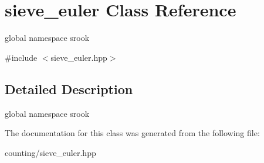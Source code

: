 \hypertarget{classsieve__euler}{}\section{sieve\+\_\+euler Class Reference}
\label{classsieve__euler}


global namespace srook  




{\ttfamily \#include $<$sieve\+\_\+euler.\+hpp$>$}



\subsection{Detailed Description}
global namespace srook 

The documentation for this class was generated from the following file\+:\begin{DoxyCompactItemize}
\item 
counting/sieve\+\_\+euler.\+hpp\end{DoxyCompactItemize}
